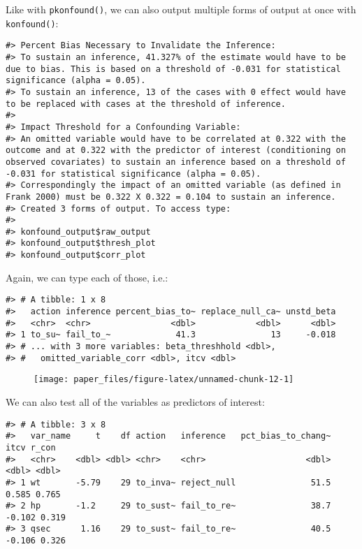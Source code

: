 \documentclass[man]{apa6}
\begin{document}
Like with \texttt{pkonfound()}, we can also output multiple forms of
output at once with \texttt{konfound()}:

\begin{verbatim}
#> Percent Bias Necessary to Invalidate the Inference:
#> To sustain an inference, 41.327% of the estimate would have to be due to bias. This is based on a threshold of -0.031 for statistical significance (alpha = 0.05).
#> To sustain an inference, 13 of the cases with 0 effect would have to be replaced with cases at the threshold of inference.
#> 
#> Impact Threshold for a Confounding Variable:
#> An omitted variable would have to be correlated at 0.322 with the outcome and at 0.322 with the predictor of interest (conditioning on observed covariates) to sustain an inference based on a threshold of -0.031 for statistical significance (alpha = 0.05).
#> Correspondingly the impact of an omitted variable (as defined in Frank 2000) must be 0.322 X 0.322 = 0.104 to sustain an inference.
#> Created 3 forms of output. To access type: 
#> 
#> konfound_output$raw_output
#> konfound_output$thresh_plot
#> konfound_output$corr_plot
\end{verbatim}

Again, we can type each of those, i.e.:

\begin{verbatim}
#> # A tibble: 1 x 8
#>   action inference percent_bias_to~ replace_null_ca~ unstd_beta
#>   <chr>  <chr>                <dbl>            <dbl>      <dbl>
#> 1 to_su~ fail_to_~             41.3               13     -0.018
#> # ... with 3 more variables: beta_threshhold <dbl>,
#> #   omitted_variable_corr <dbl>, itcv <dbl>
\end{verbatim}

\begin{figure}

{\centering \texttt{[image: paper\_files/figure-latex/unnamed-chunk-12-1]} 

}

\caption{ }\label{fig:unnamed-chunk-12}
\end{figure}

We can also test all of the variables as predictors of interest:

\begin{verbatim}
#> # A tibble: 3 x 8
#>   var_name     t    df action   inference   pct_bias_to_chang~   itcv r_con
#>   <chr>    <dbl> <dbl> <chr>    <chr>                    <dbl>  <dbl> <dbl>
#> 1 wt       -5.79    29 to_inva~ reject_null               51.5  0.585 0.765
#> 2 hp       -1.2     29 to_sust~ fail_to_re~               38.7 -0.102 0.319
#> 3 qsec      1.16    29 to_sust~ fail_to_re~               40.5 -0.106 0.326
\end{verbatim}
\end{document}

